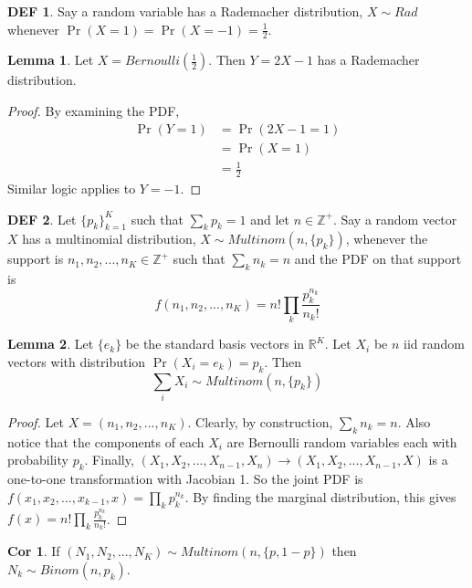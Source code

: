 \documentclass{article}
\theoremstyle{definition}\newtheorem{definition}{DEF}
\theoremstyle{definition}\newtheorem{example}{Ex}
\theoremstyle{lemma}\newtheorem{lemma}{Lemma}
\theoremstyle{corrolary}\newtheorem{corrolary}{Cor}
\begin{document}
\begin{definition}
Say a random variable has a Rademacher distribution, $X\sim Rad$ whenever $\Pr(X=1)=\Pr(X=-1)=\frac{1}{2}$.
\end{definition}

\begin{lemma}
Let $X=Bernoulli(\frac{1}{2})$.
Then $Y=2X-1$ has a Rademacher distribution.
\end{lemma}
\begin{proof}
By examining the PDF,
\begin{align*}
\Pr(Y=1)&=\Pr(2X-1=1)\\
&=\Pr(X=1)\\
&=\frac{1}{2}
\end{align*}
Similar logic applies to $Y=-1$.
\end{proof}

\begin{definition}
Let $\{p_k\}_{k=1}^K$ such that $\sum_k p_k=1$ and let $n\in\mathbb{Z}^+$.
Say a random vector $X$ has a multinomial distribution, $X\sim Multinom(n,\{p_k\})$, whenever the support is $n_1, n_2, ..., n_K\in \mathbb{Z}^+$ such that $\sum_k n_k = n$ and the PDF on that support is
\begin{equation}
f(n_1, n_2, ..., n_K)=n! \prod_k \frac{p_k^{n_k}}{n_k!}
\end{equation}
\end{definition}

\begin{lemma}
Let $\{e_k\}$ be the standard basis vectors in $\mathbb{R}^K$.
Let $X_i$ be $n$ iid random vectors with distribution $\Pr(X_i = e_k)=p_k$.
Then 
\begin{equation}
\sum_i X_i \sim Multinom(n, \{p_k\})
\end{equation}
\end{lemma}
\begin{proof}
Let $X=(n_1, n_2, ..., n_K)$.
Clearly, by construction, $\sum_k n_k = n$.
Also notice that the components of each $X_i$ are Bernoulli random variables each with probability $p_k$.
Finally, $(X_1, X_2, ..., X_{n-1}, X_n) \rightarrow (X_1, X_2, ..., X_{n-1}, X)$ is a one-to-one transformation with Jacobian 1.
So the joint PDF is $f(x_1, x_2, ..., x_{k-1}, x)=\prod_k p_k^{n_k}$.
By finding the marginal distribution, this gives $f(x)=n!\prod_k \frac{p_k^{n_k}}{n_k!}$.
\end{proof}
\begin{corrolary}
If $(N_1, N_2, ..., N_K)\sim Multinom(n, \{p, 1-p\})$ then $N_k\sim Binom(n,p_k)$.
\end{corrolary}
\end{document}
